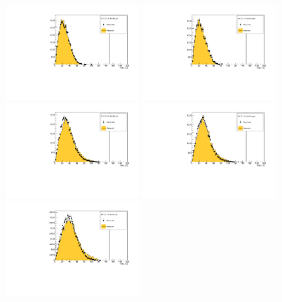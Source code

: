 \begin{figure}[!tbh]
    \centering
    \includegraphics*[width=0.45\textwidth]{02-Cuts/Figures/2017-2.7_3-140_lH2_full/tku_max_r_us_cut.pdf}
    \includegraphics*[width=0.45\textwidth]{02-Cuts/Figures/2017-2.7_3-140_lH2_empty/tku_max_r_us_cut.pdf}
    \includegraphics*[width=0.45\textwidth]{02-Cuts/Figures/2017-2.7_6-140_lH2_full/tku_max_r_us_cut.pdf}
    \includegraphics*[width=0.45\textwidth]{02-Cuts/Figures/2017-2.7_6-140_lH2_empty/tku_max_r_us_cut.pdf}
    \includegraphics*[width=0.45\textwidth]{02-Cuts/Figures/2017-2.7_10-140_lH2_full/tku_max_r_us_cut.pdf}

\end{figure}
